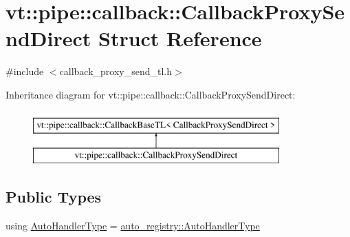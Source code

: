 \hypertarget{structvt_1_1pipe_1_1callback_1_1_callback_proxy_send_direct}{}\section{vt\+:\+:pipe\+:\+:callback\+:\+:Callback\+Proxy\+Send\+Direct Struct Reference}
\label{structvt_1_1pipe_1_1callback_1_1_callback_proxy_send_direct}


{\ttfamily \#include $<$callback\+\_\+proxy\+\_\+send\+\_\+tl.\+h$>$}

Inheritance diagram for vt\+:\+:pipe\+:\+:callback\+:\+:Callback\+Proxy\+Send\+Direct\+:\begin{figure}[H]
\begin{center}
\leavevmode
\includegraphics[height=2.000000cm]{structvt_1_1pipe_1_1callback_1_1_callback_proxy_send_direct}
\end{center}
\end{figure}
\subsection*{Public Types}
\begin{DoxyCompactItemize}
\item 
using \hyperlink{structvt_1_1pipe_1_1callback_1_1_callback_proxy_send_direct_adbd70e6c1d6b374083e5d0babdcab07e}{Auto\+Handler\+Type} = \hyperlink{namespacevt_1_1auto__registry_ae295e18699146815bb7d7674594d95d7}{auto\+\_\+registry\+::\+Auto\+Handler\+Type}
\end{DoxyCompactItemize}

